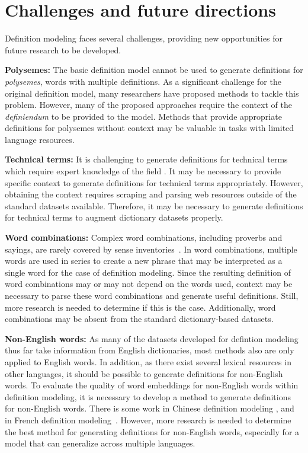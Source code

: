 \section{Challenges and future directions}
Definition modeling faces several challenges, providing new opportunities for future research to be developed.

\noindent\textbf{Polysemes:} The basic definition model cannot be used to generate definitions for \textit{polysemes}, words with multiple definitions. As a
significant challenge for the original definition model, many researchers have
proposed methods to tackle this problem. However, many of the proposed
approaches require the context of the \textit{definiendum} to be provided to the
model. Methods that provide appropriate definitions for polysemes without
context may be valuable in tasks with limited language resources.

\noindent\textbf{Technical terms:} It is challenging to generate definitions for technical terms which require expert knowledge of the field \cite{huang_cdm_2021}. It may
be necessary to provide specific context to generate
definitions for technical terms appropriately. However, obtaining the context requires
scraping and parsing web resources outside of the standard datasets available. Therefore, it may be necessary to generate definitions for technical
terms to augment dictionary datasets properly.

\noindent\textbf{Word combinations:} Complex word combinations, including proverbs and sayings, are rarely covered by sense inventories~\cite{bevilacqua_generationary_2020}. In word combinations, multiple words are used in series to create a new phrase that may be interpreted as a single word for the case of definition modeling. Since the resulting definition
of word combinations may or may not depend on the words used, context may be necessary to parse these word combinations and generate useful definitions. Still, more research is needed to determine if this is the case.
Additionally, word combinations may be absent from the standard dictionary-based datasets.

\noindent\textbf{Non-English words:} As many of the datasets developed for defintion modeling thus far take information from English dictionaries, most methods also
are only applied to English words. In addition, as there exist several lexical resources in other languages, it should be possible to generate definitions for non-English words. To evaluate the quality of word embeddings for
non-English words within definition modeling, it is necessary to develop a method to generate definitions for non-English words. There is some work in Chinese definition modeling \cite{zheng_decompose_2021}, and in French
definition modeling~\cite{reid_vcdm_2020}. However, more research is needed to determine the best method for generating definitions for non-English words, 
especially for a model that can generalize across multiple languages.

